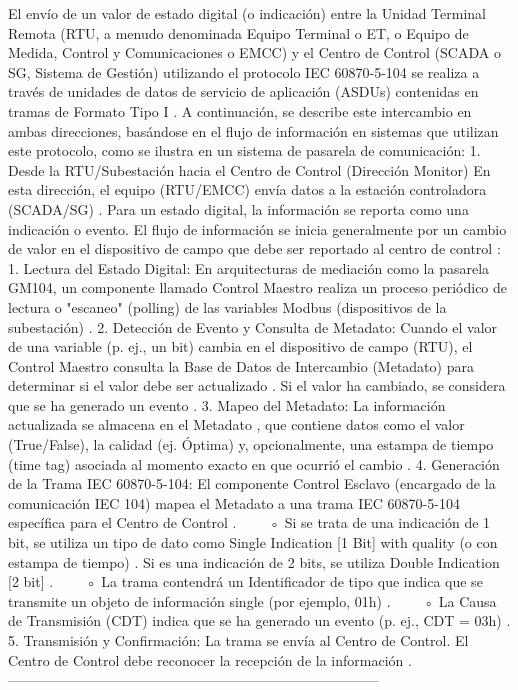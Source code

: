 \documentclass[a5paper]{book}%
\begin{document}
El envío de un valor de estado digital (o indicación) entre la Unidad Terminal Remota (RTU, a menudo denominada Equipo Terminal o ET, o Equipo de Medida, Control y Comunicaciones o EMCC) y el Centro de Control (SCADA o SG, Sistema de Gestión) utilizando el protocolo IEC 60870-5-104 se realiza a través de unidades de datos de servicio de aplicación (ASDUs) contenidas en tramas de Formato Tipo I
.
A continuación, se describe este intercambio en ambas direcciones, basándose en el flujo de información en sistemas que utilizan este protocolo, como se ilustra en un sistema de pasarela de comunicación:
1. Desde la RTU/Subestación hacia el Centro de Control (Dirección Monitor)
En esta dirección, el equipo (RTU/EMCC) envía datos a la estación controladora (SCADA/SG)
. Para un estado digital, la información se reporta como una indicación o evento.
El flujo de información se inicia generalmente por un cambio de valor en el dispositivo de campo que debe ser reportado al centro de control
:
1. Lectura del Estado Digital: En arquitecturas de mediación como la pasarela GM104, un componente llamado Control Maestro realiza un proceso periódico de lectura o "escaneo" (polling) de las variables Modbus (dispositivos de la subestación)
.
2. Detección de Evento y Consulta de Metadato: Cuando el valor de una variable (p. ej., un bit) cambia en el dispositivo de campo (RTU), el Control Maestro consulta la Base de Datos de Intercambio (Metadato) para determinar si el valor debe ser actualizado
. Si el valor ha cambiado, se considera que se ha generado un evento
.
3. Mapeo del Metadato: La información actualizada se almacena en el Metadato
, que contiene datos como el valor (True/False), la calidad (ej. Óptima) y, opcionalmente, una estampa de tiempo (time tag) asociada al momento exacto en que ocurrió el cambio
.
4. Generación de la Trama IEC 60870-5-104: El componente Control Esclavo (encargado de la comunicación IEC 104) mapea el Metadato a una trama IEC 60870-5-104 específica para el Centro de Control
.
    ◦ Si se trata de una indicación de 1 bit, se utiliza un tipo de dato como Single Indication [1 Bit] with quality (o con estampa de tiempo)
. Si es una indicación de 2 bits, se utiliza Double Indication [2 bit]
.
    ◦ La trama contendrá un Identificador de tipo que indica que se transmite un objeto de información single (por ejemplo, 01h)
.
    ◦ La Causa de Transmisión (CDT) indica que se ha generado un evento (p. ej., CDT = 03h)
.
5. Transmisión y Confirmación: La trama se envía al Centro de Control. El Centro de Control debe reconocer la recepción de la información
.
-------------------------------------------------------------------------------- 
\end{document}

